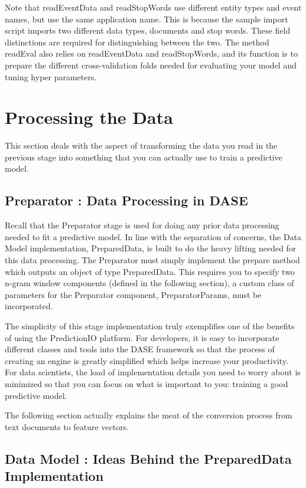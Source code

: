 \documentclass[a4paper,12pt]{article}
\newcommand{\3}{\left}
\newcommand{\4}{\right}
\renewcommand{\-}[1]{{}^{-#1}}
\begin{document}
Note that readEventData and readStopWords use different entity types and event names, but use the same application name. This is because the sample import script imports two different data types, documents and stop words. These field distinctions are required for distinguishing between the two. The method readEval also relies on readEventData and readStopWords, and its function is to prepare the different cross-validation folds needed for evaluating your model and tuning hyper parameters. 

\section*{Processing the Data}

This section deals with the aspect of transforming the data you read in the previous stage into something that you can actually use to train a predictive model. 

\subsection*{Preparator : Data Processing in DASE}

Recall that the Preparator stage is used for doing any prior data processing needed to fit a predictive model. In line with the separation of concerns, the Data Model implementation, PreparedData, is built to do the heavy lifting needed for this data processing. The Preparator must simply implement the prepare method which outputs an object of type PreparedData. This requires you to specify two n-gram window components (defined in the following section), a custom class of parameters for the Preparator component, PreparatorParams, must be incorporated. 

The simplicity of this stage implementation truly exemplifies one of the benefits of using the PredictionIO platform. For developers, it is easy to incorporate different classes and tools into the DASE framework so that the process of creating an engine is greatly simplified which helps increase your productivity. For data scientists, the load of implementation details you need to worry about is minimized so that you can focus on what is important to you: training a good predictive model. 

The following section actually explains the meat of the conversion process from text documents to feature vectors.

\subsection*{Data Model : Ideas Behind the PreparedData Implementation}
\end{document}
